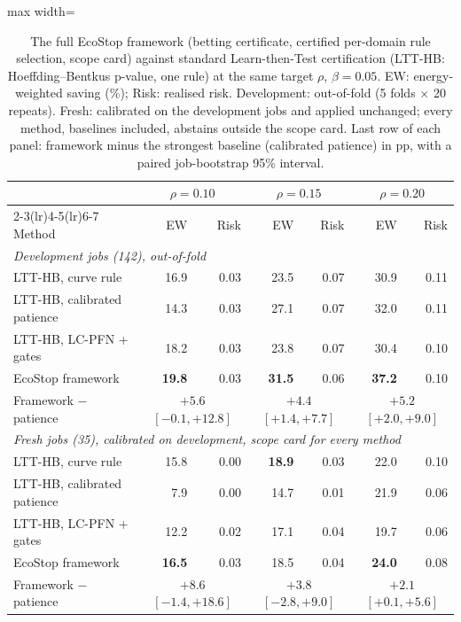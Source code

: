 \documentclass[3p,twocolumn,10pt]{elsarticle}
\theoremstyle{definition}
\begin{document}
\begin{table}[t]
\centering
\caption{The full EcoStop framework (betting certificate, certified per-domain rule selection, scope card) against standard Learn-then-Test certification (LTT-HB: Hoeffding--Bentkus p-value, one rule) at the same target $\rho$, $\beta=0.05$. EW: energy-weighted saving (\%); Risk: realised risk. Development: out-of-fold (5 folds $\times$ 20 repeats). Fresh: calibrated on the development jobs and applied unchanged; every method, baselines included, abstains outside the scope card. Last row of each panel: framework minus the strongest baseline (calibrated patience) in pp, with a paired job-bootstrap 95\% interval.}
\label{tab:pipeline}
\footnotesize
\begin{adjustbox}{max width=\textwidth}
\begin{tabular}{lrrrrrr}
\toprule
 & \multicolumn{2}{c}{$\rho=0.10$} & \multicolumn{2}{c}{$\rho=0.15$} & \multicolumn{2}{c}{$\rho=0.20$} \\
\cmidrule(lr){2-3}\cmidrule(lr){4-5}\cmidrule(lr){6-7}
Method & EW & Risk & EW & Risk & EW & Risk \\
\midrule
\multicolumn{7}{l}{\emph{Development jobs (142), out-of-fold}}\\
LTT-HB, curve rule & 16.9 & 0.03 & 23.5 & 0.07 & 30.9 & 0.11 \\
LTT-HB, calibrated patience & 14.3 & 0.03 & 27.1 & 0.07 & 32.0 & 0.11 \\
LTT-HB, LC-PFN + gates & 18.2 & 0.03 & 23.8 & 0.07 & 30.4 & 0.10 \\
EcoStop framework & \textbf{19.8} & 0.03 & \textbf{31.5} & 0.06 & \textbf{37.2} & 0.10 \\
Framework $-$ patience & \multicolumn{2}{c}{$+5.6$ $[-0.1,+12.8]$} & \multicolumn{2}{c}{$+4.4$ $[+1.4,+7.7]$} & \multicolumn{2}{c}{$+5.2$ $[+2.0,+9.0]$} \\
\midrule
\multicolumn{7}{l}{\emph{Fresh jobs (35), calibrated on development, scope card for every method}}\\
LTT-HB, curve rule & 15.8 & 0.00 & \textbf{18.9} & 0.03 & 22.0 & 0.10 \\
LTT-HB, calibrated patience & 7.9 & 0.00 & 14.7 & 0.01 & 21.9 & 0.06 \\
LTT-HB, LC-PFN + gates & 12.2 & 0.02 & 17.1 & 0.04 & 19.7 & 0.06 \\
EcoStop framework & \textbf{16.5} & 0.03 & 18.5 & 0.04 & \textbf{24.0} & 0.08 \\
Framework $-$ patience & \multicolumn{2}{c}{$+8.6$ $[-1.4,+18.6]$} & \multicolumn{2}{c}{$+3.8$ $[-2.8,+9.0]$} & \multicolumn{2}{c}{$+2.1$ $[+0.1,+5.6]$} \\
\bottomrule
\end{tabular}
\end{adjustbox}
\end{table}
\end{document}

